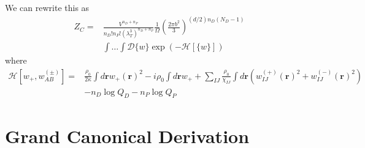 \documentclass{article}
\begin{document}
We can rewrite this as
\begin{align*}
  Z_C =& \frac{V^{n_D+n_P}}
              {n_D!n_P! \left( \lambda_T^3 \right)^{n_D+n_P}}
    \frac{1}{\Omega}
    \left( \frac{2\pi b^2}{3} \right)
      ^{(d/2)n_D(N_D-1)} \\
    &\int \hdots \int \mathcal{D} \{w\}
    \exp \left(
      -\mathcal{H}[\{w\}]
    \right)
\end{align*}
where
\begin{align*}
  \mathcal{H}[w_+, w_{AB}^{(\pm)}] =&
    \frac{\rho_0}{2\kappa} \int d \mathbf{r} w_+(\mathbf{r})^2
    - i \rho_0 \int d\mathbf{r} w_+
    + \sum_{IJ}
    \frac{\rho_0}{\chi_{IJ}}
    \int d \mathbf{r}
    \left(
      w_{IJ}^{(+)} (\mathbf{r})^2 + w_{IJ}^{(-)} (\mathbf{r})^2
    \right) \\
    &- n_D \log Q_D - n_P \log Q_P
\end{align*}

\section{Grand Canonical Derivation}
\end{document}
